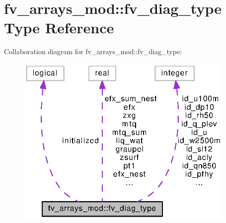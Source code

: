 \section{fv\-\_\-arrays\-\_\-mod\-:\-:fv\-\_\-diag\-\_\-type Type Reference}
\label{structfv__arrays__mod_1_1fv__diag__type}


Collaboration diagram for fv\-\_\-arrays\-\_\-mod\-:\-:fv\-\_\-diag\-\_\-type\-:
\nopagebreak
\begin{figure}[H]
\begin{center}
\leavevmode
\includegraphics[width=299pt]{structfv__arrays__mod_1_1fv__diag__type__coll__graph}
\end{center}
\end{figure}
